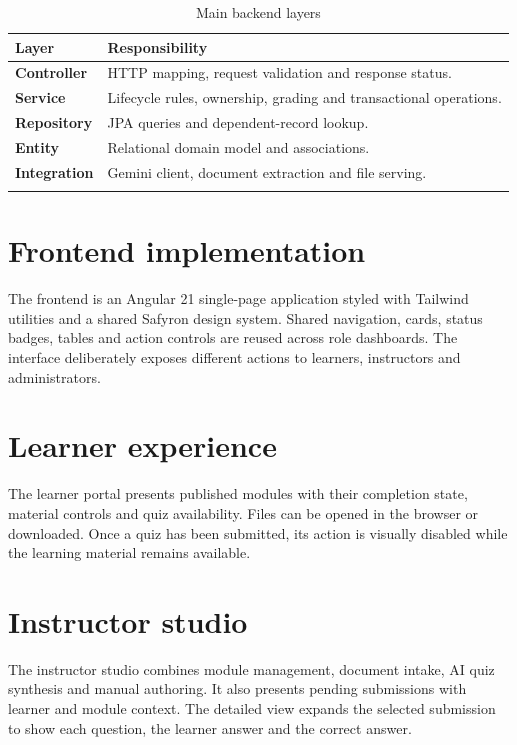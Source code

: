 \begin{table}[H]\centering
\caption{Main backend layers}\label{tab:backend-layers}
\begin{tabularx}{\textwidth}{>{\bfseries}p{}X}
\toprule Layer & Responsibility\\\midrule
Controller & HTTP mapping, request validation and response status.\\
Service & Lifecycle rules, ownership, grading and transactional operations.\\
Repository & JPA queries and dependent-record lookup.\\
Entity & Relational domain model and associations.\\
Integration & Gemini client, document extraction and file serving.\\\\
\bottomrule
\end{tabularx}
\end{table}

\section{Frontend implementation}
The frontend is an Angular 21 single-page application styled with Tailwind
utilities and a shared Safyron design system. Shared navigation, cards,
status badges, tables and action controls are reused across role dashboards.
The interface deliberately exposes different actions to learners, instructors
and administrators.

\section{Learner experience}
The learner portal presents published modules with their completion state,
material controls and quiz availability. Files can be opened in the browser or
downloaded. Once a quiz has been submitted, its action is visually disabled
while the learning material remains available.

\section{Instructor studio}
The instructor studio combines module management, document intake, AI quiz
synthesis and manual authoring. It also presents pending submissions with
learner and module context. The detailed view expands the selected submission
to show each question, the learner answer and the correct answer.

